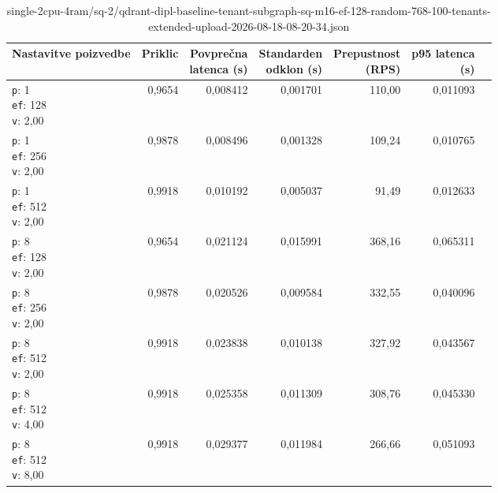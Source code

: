 \begin{table}[htbp]
  \centering
\small
  \caption{single-2cpu-4ram/sq-2/qdrant-dipl-baseline-tenant-subgraph-sq-m16-ef-128-random-768-100-tenants-extended-upload-2026-08-18-08-20-34.json}
  \label{tab:single-2cpu-4ram:sq-2:qdrant-dipl-baseline-tenant-subgraph-sq-m16-ef-128-random-768-100-tenants-extended-upload-2026-08-18-08-20-34.json}
  \begin{tabularx}{\textwidth}{Xrrrrrr}
    \toprule
    Nastavitve poizvedbe & Priklic & \makecell{Povprečna\\latenca (s)} & \makecell{Standarden\\odklon (s)} & \makecell{Prepustnost\\(RPS)} & \makecell{p95 latenca\\(s)}  \\
    \midrule
    \makecell{\texttt{p}: 1\\\texttt{ef}: 128\\\texttt{v}: 2,00} & 0,9654 & 0,008412 & 0,001701 & 110,00 & 0,011093 \\
    \makecell{\texttt{p}: 1\\\texttt{ef}: 256\\\texttt{v}: 2,00} & 0,9878 & 0,008496 & 0,001328 & 109,24 & 0,010765 \\
    \makecell{\texttt{p}: 1\\\texttt{ef}: 512\\\texttt{v}: 2,00} & 0,9918 & 0,010192 & 0,005037 & 91,49 & 0,012633 \\
    \makecell{\texttt{p}: 8\\\texttt{ef}: 128\\\texttt{v}: 2,00} & 0,9654 & 0,021124 & 0,015991 & 368,16 & 0,065311 \\
    \makecell{\texttt{p}: 8\\\texttt{ef}: 256\\\texttt{v}: 2,00} & 0,9878 & 0,020526 & 0,009584 & 332,55 & 0,040096 \\
    \makecell{\texttt{p}: 8\\\texttt{ef}: 512\\\texttt{v}: 2,00} & 0,9918 & 0,023838 & 0,010138 & 327,92 & 0,043567 \\
    \makecell{\texttt{p}: 8\\\texttt{ef}: 512\\\texttt{v}: 4,00} & 0,9918 & 0,025358 & 0,011309 & 308,76 & 0,045330 \\
    \makecell{\texttt{p}: 8\\\texttt{ef}: 512\\\texttt{v}: 8,00} & 0,9918 & 0,029377 & 0,011984 & 266,66 & 0,051093 \\

\end{tabularx}
\end{table}
